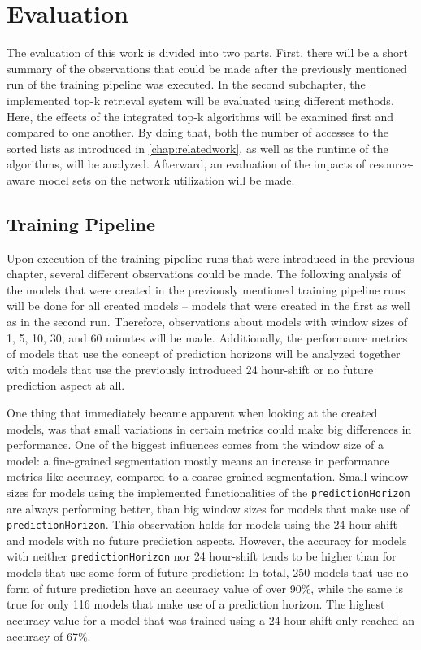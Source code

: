 \chapter{Evaluation} \label{chap:evaluation}

The evaluation of this work is divided into two parts. First, there will be a short summary of the observations that could be made after the previously mentioned run of the training pipeline was executed. In the second subchapter, the implemented top-k retrieval system will be evaluated using different methods. Here, the effects of the integrated top-k algorithms will be examined first and compared to one another. By doing that, both the number of accesses to the sorted lists as introduced in \autoref{chap:relatedwork}, as well as the runtime of the algorithms, will be analyzed. Afterward, an evaluation of the impacts of resource-aware model sets on the network utilization will be made.
  
  
  
  \section{Training Pipeline}
  
  Upon execution of the training pipeline runs that were introduced in the previous chapter, several different observations could be made. The following analysis of the models that were created in the previously mentioned training pipeline runs will be done for all created models – models that were created in the first as well as in the second run. Therefore, observations about models with window sizes of 1, 5, 10, 30, and 60 minutes will be made. Additionally, the performance metrics of models that use the concept of prediction horizons will be analyzed together with models that use the previously introduced 24 hour-shift or no future prediction aspect at all.
  
  One thing that immediately became apparent when looking at the created models, was that small variations in certain metrics could make big differences in performance. One of the biggest influences comes from the window size of a model: a fine-grained segmentation mostly means an increase in performance metrics like accuracy, compared to a coarse-grained segmentation. Small window sizes for models using the implemented functionalities of the \texttt{predictionHorizon} are always performing better, than big window sizes for models that make use of \texttt{predictionHorizon}. This observation holds for models using the 24 hour-shift and models with no future prediction aspects. However, the accuracy for models with neither \texttt{predictionHorizon} nor 24 hour-shift tends to be higher than for models that use some form of future prediction: In total, 250 models that use no form of future prediction have an accuracy value of over 90\%, while the same is true for only 116 models that make use of a prediction horizon. The highest accuracy value for a model that was trained using a 24 hour-shift only reached an accuracy of 67\%. 
  
